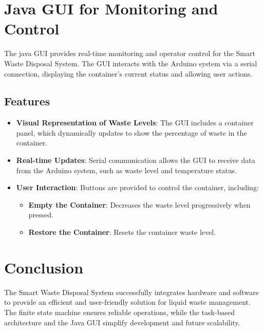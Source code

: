 \documentclass[a4paper]{article}
\begin{document}
	\section{Java GUI for Monitoring and Control}
	The java GUI provides real-time monitoring and operator control for the Smart Waste Disposal System. The GUI interacts with the Arduino system via a serial connection, displaying the container's current status and allowing user actions.

	\subsection{Features}
	\begin{itemize}
		\item \textbf{Visual Representation of Waste Levels}: 
		The GUI includes a container panel, which dynamically updates to show the percentage of waste in the container.
		\item \textbf{Real-time Updates}: 
		Serial communication allows the GUI to receive data from the Arduino system, such as waste level and temperature status.
		\item \textbf{User Interaction}: 
		Buttons are provided to control the container, including:
		\begin{itemize}
			\item \textbf{Empty the Container}: Decreases the waste level progressively when pressed.
			\item \textbf{Restore the Container}: Resets the container waste level.
		\end{itemize}
	\end{itemize}

    \section{Conclusion}
    The Smart Waste Disposal System successfully integrates hardware and software to provide an efficient and user-friendly solution for liquid waste management. The finite state machine ensures reliable operations, while the task-based architecture and the Java GUI simplify development and future scalability.
\end{document}
